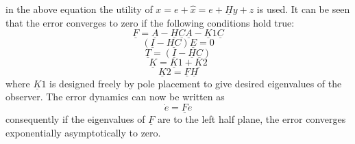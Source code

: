 in the above equation the utility of $x  = e + \hat{x} = e + \underline Hy+z$ is used. It can be seen that the error converges to zero if the following conditions hold true:
 \begin{equation}
 \underline F = \underline A-\underline H \underline C \underline A-\underline K1 \underline C
 \label{errordynamics3}
 \end{equation}
\begin{equation}
(\underline I - \underline{HC})\underline E = 0
\label{errordynamics4}
\end{equation}
\begin{equation}
\underline T = (\underline I - \underline H\underline C)
\label{errordynamics5}
\end{equation}
\begin{equation}
\underline K = \underline K1 +\underline K2
\label{errordynamics6}
\end{equation}
\begin{equation}
\underline K2 =\underline F \underline H 
\label{errordynamics7}
\end{equation}
where $\underline K1$ is designed freely by pole placement to give desired eigenvalues of the observer. The error dynamics can now be written as 
\begin{equation}
\dot{e} = \underline F e
\label{errordynamics8}
\end{equation}
consequently if the eigenvalues of $\underline F$ are to the left half plane, the error converges exponentially asymptotically to zero. 


